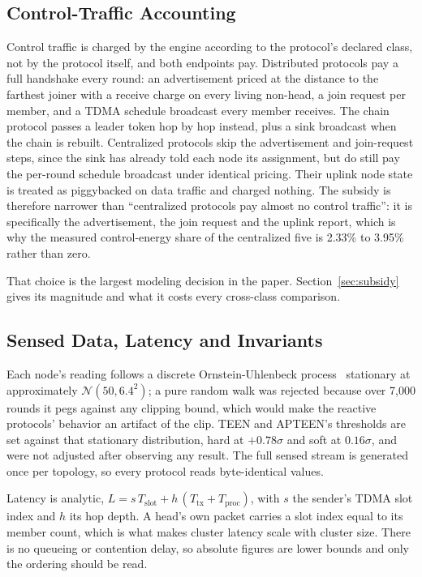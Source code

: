 \subsection{Control-Traffic Accounting}
\label{sec:control}

Control traffic is charged by the engine according to the protocol's declared
class, not by the protocol itself, and both endpoints pay. Distributed protocols
pay a full handshake every round: an advertisement priced at the distance to the
farthest joiner with a receive charge on every living non-head, a join request
per member, and a TDMA schedule broadcast every member receives. The chain
protocol passes a leader token hop by hop instead, plus a sink broadcast when
the chain is rebuilt. Centralized protocols skip the advertisement and
join-request steps, since the sink has already told each node its assignment,
but do still pay the per-round schedule broadcast under identical pricing. Their
uplink node state is treated as piggybacked on data traffic and charged nothing.
The subsidy is therefore narrower than ``centralized protocols pay almost no
control traffic'': it is specifically the advertisement, the join request and
the uplink report, which is why the measured control-energy share of the
centralized five is 2.33\% to 3.95\% rather than zero.

That choice is the largest modeling decision in the paper.
Section~\ref{sec:subsidy} gives its magnitude and what it costs every
cross-class comparison.

\subsection{Sensed Data, Latency and Invariants}
\label{sec:invariants}

Each node's reading follows a discrete Ornstein-Uhlenbeck
process~\cite{uhlenbeck1930brownian} stationary at approximately
$\mathcal{N}(50, 6.4^2)$; a pure random walk was rejected because over 7{,}000
rounds it pegs against any clipping bound, which would make the reactive
protocols' behavior an artifact of the clip. TEEN and APTEEN's thresholds are
set against that stationary distribution, hard at $+0.78\sigma$ and soft at
$0.16\sigma$, and were not adjusted after observing any result. The full sensed
stream is generated once per topology, so every protocol reads byte-identical
values.

Latency is analytic,
$L = s\,T_{\mathrm{slot}} + h\,(T_{\mathrm{tx}} + T_{\mathrm{proc}})$, with $s$
the sender's TDMA slot index and $h$ its hop depth. A head's own packet carries
a slot index equal to its member count, which is what makes cluster latency
scale with cluster size. There is no queueing or contention delay, so absolute
figures are lower bounds and only the ordering should be read.

